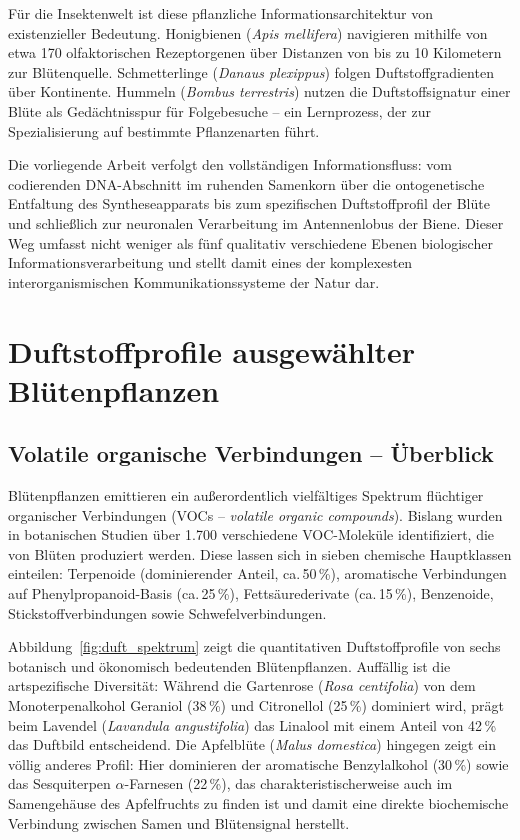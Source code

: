 ﻿\documentclass[12pt,a4paper]{article}
\begin{document}
F\"ur die Insektenwelt ist diese pflanzliche Informationsarchitektur von existenzieller Bedeutung. Honigbienen (\textit{Apis mellifera}) navigieren mithilfe von etwa 170 olfaktorischen Rezeptorgenen \"uber Distanzen von bis zu 10 Kilometern zur Bl\"utenquelle. Schmetterlinge (\textit{Danaus plexippus}) folgen Duftstoffgradienten \"uber Kontinente. Hummeln (\textit{Bombus terrestris}) nutzen die Duftstoffsignatur einer Bl\"ute als Ged\"achtnisspur f\"ur Folgebesuche -- ein Lernprozess, der zur Spezialisierung auf bestimmte Pflanzenarten f\"uhrt.

Die vorliegende Arbeit verfolgt den vollst\"andigen Informationsfluss: vom codierenden DNA-Abschnitt im ruhenden Samenkorn \"uber die ontogenetische Entfaltung des Syntheseapparats bis zum spezifischen Duftstoffprofil der Bl\"ute und schlie{\ss}lich zur neuronalen Verarbeitung im Antennenlobus der Biene. Dieser Weg umfasst nicht weniger als f\"unf qualitativ verschiedene Ebenen biologischer Informationsverarbeitung und stellt damit eines der komplexesten interorganismischen Kommunikationssysteme der Natur dar.

\section{Duftstoffprofile ausgew\"ahlter Bl\"utenpflanzen}

\subsection{Volatile organische Verbindungen -- \"Uberblick}

Bl\"utenpflanzen emittieren ein au{\ss}erordentlich vielf\"altiges Spektrum fl\"uchtiger organischer Verbindungen (VOCs -- \textit{volatile organic compounds}). Bislang wurden in botanischen Studien \"uber 1.700 verschiedene VOC-Molek\"ule identifiziert, die von Bl\"uten produziert werden. Diese lassen sich in sieben chemische Hauptklassen einteilen: Terpenoide (dominierender Anteil, ca.\,50\,\%), aromatische Verbindungen auf Phenylpropanoid-Basis (ca.\,25\,\%), Fetts\"aurederivate (ca.\,15\,\%), Benzenoide, Stickstoffverbindungen sowie Schwefelverbindungen.

Abbildung~\ref{fig:duft_spektrum} zeigt die quantitativen Duftstoffprofile von sechs botanisch und \"okonomisch bedeutenden Bl\"utenpflanzen. Auff\"allig ist die artspezifische Diversit\"at: W\"ahrend die Gartenrose (\textit{Rosa centifolia}) von dem Monoterpenalkohol Geraniol (38\,\%) und Citronellol (25\,\%) dominiert wird, pr\"agt beim Lavendel (\textit{Lavandula angustifolia}) das Linalool mit einem Anteil von 42\,\% das Duftbild entscheidend. Die Apfelbl\"ute (\textit{Malus domestica}) hingegen zeigt ein v\"ollig anderes Profil: Hier dominieren der aromatische Benzylalkohol (30\,\%) sowie das Sesquiterpen $\alpha$-Farnesen (22\,\%), das charakteristischerweise auch im Samengeh\"ause des Apfelfruchts zu finden ist und damit eine direkte biochemische Verbindung zwischen Samen und Bl\"utensignal herstellt.
\end{document}
